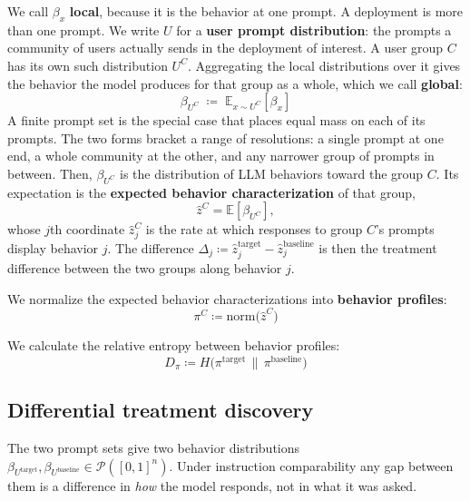 We call $\beta_x$ \textbf{local}, because it is the behavior at one prompt.
A deployment is more than one prompt.
We write $U$ for a \textbf{user prompt distribution}: the prompts a community of users actually sends in the deployment of interest.
A user group $C$ has its own such distribution $U^{C}$.
Aggregating the local distributions over it gives the behavior the model produces for that group as a whole, which we call \textbf{global}:
\begin{equation}
    \beta_{U^C}
    \;\coloneqq\;
    \mathbb{E}_{x \sim U^{C}}\left[ \beta_x \right]
    \label{eq:community-behavior-distribution}
\end{equation}
A finite prompt set is the special case that places equal mass on each of its prompts.
The two forms bracket a range of resolutions: a single prompt at one end, a whole community at the other, and any narrower group of prompts in between.
Then, $\beta_{U^C}$ is the distribution of LLM behaviors toward the group $C$. Its expectation is the \textbf{expected behavior characterization} of that group,
\begin{equation}
    \hat{z}^{C} = \mathbb{E}\left[ \beta_{U^{C}} \right],
    \label{eq:expected-behavior-characterization}
\end{equation}
whose $j$th coordinate $\hat{z}^{C}_{j}$ is the rate at which responses to group $C$'s prompts display behavior $j$.
The difference $\Delta_j \coloneqq \hat{z}^{\text{target}}_{j} - \hat{z}^{\text{baseline}}_{j}$ is then the treatment difference between the two groups along behavior $j$.

We normalize the expected behavior characterizations into \textbf{behavior profiles}:
\begin{equation}
    \pi^{C} \coloneqq \mathrm{norm}\big(\hat{z}^{C}\big)
    \label{eq:treatment-profile}
\end{equation}

We calculate the relative entropy between behavior profiles:
\begin{equation}
    D_{\pi} \coloneqq H\big(\pi^{\text{target}} \,\big\|\, \pi^{\text{baseline}}\big)
    \label{eq:profile-relative-entropy}
\end{equation}

\subsection{Differential treatment discovery}
\label{app:task-def}
The two prompt sets give two behavior distributions $\beta_{U^{\text{target}}}, \beta_{U^{\text{baseline}}} \in \mathcal{P}([0,1]^n)$.
Under instruction comparability any gap between them is a difference in \emph{how} the model responds, not in what it was asked.

